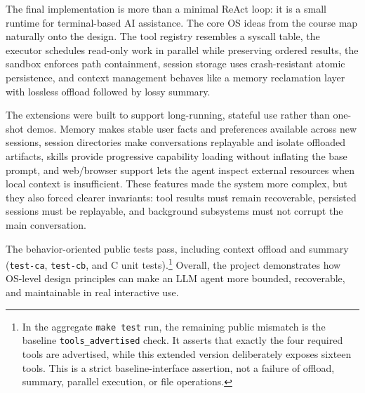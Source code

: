 \documentclass[11pt,a4paper]{article}
\begin{document}
The final implementation is more than a minimal ReAct loop: it is a small
runtime for terminal-based AI assistance. The core OS ideas from the course map
naturally onto the design. The tool registry resembles a syscall table, the
executor schedules read-only work in parallel while preserving ordered results,
the sandbox enforces path containment, session storage uses crash-resistant
atomic persistence, and context management behaves like a memory reclamation
layer with lossless offload followed by lossy summary.

The extensions were built to support long-running, stateful use rather than
one-shot demos. Memory makes stable user facts and preferences available across
new sessions, session directories make conversations replayable and isolate
offloaded artifacts, skills provide progressive capability loading without
inflating the base prompt, and web/browser support lets the agent inspect
external resources when local context is insufficient. These features made the
system more complex, but they also forced clearer invariants: tool results must
remain recoverable, persisted sessions must be replayable, and background
subsystems must not corrupt the main conversation.

The behavior-oriented public tests pass, including context offload and summary
(\texttt{test-ca}, \texttt{test-cb}, and C unit tests).\footnote{\footnotesize
In the aggregate \texttt{make test} run, the remaining public mismatch is the
baseline \texttt{tools\_advertised} check. It asserts that exactly the four
required tools are advertised, while this extended version deliberately exposes
sixteen tools. This is a strict baseline-interface assertion, not a failure of
offload, summary, parallel execution, or file operations.} Overall, the
project demonstrates how OS-level design principles can make an LLM agent more
bounded, recoverable, and maintainable in real interactive use.
\end{document}
